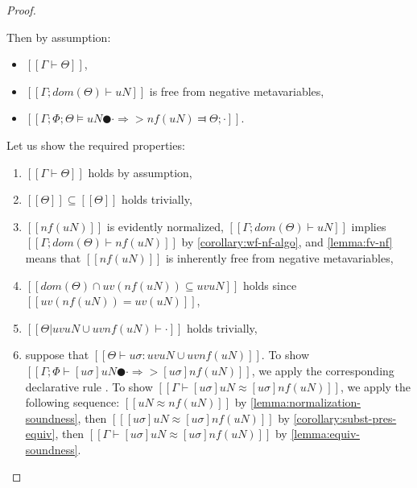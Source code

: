 \begin{proof}
\begin{caseof}
        \item {}
            Then by assumption:
            \begin{itemize}
                \item $[[Γ ⊢ Θ]]$,
                \item $[[Γ; dom(Θ) ⊢  uN]]$ is free from negative metavariables,
                \item $[[Γ; Φ; Θ ⊨ uN ● · ⇒> nf(uN) ⫤ Θ; ·]]$.
            \end{itemize}

            Let us show the required properties: 
            \begin{enumerate}
                \item $[[Γ ⊢ Θ]]$ holds by assumption,
                \item $[[Θ]] \subseteq [[Θ]]$ holds trivially,
                \item $[[nf(uN)]]$ is evidently normalized, 
                    $[[Γ; dom(Θ) ⊢  uN]]$ implies $[[Γ; dom(Θ) ⊢  nf(uN)]]$ by 
                    \cref{corollary:wf-nf-algo},
                    and \cref{lemma:fv-nf} means that $[[nf(uN)]]$ is 
                    inherently free from negative metavariables,
                \item $[[dom(Θ) ∩ uv(nf(uN)) ⊆ uv uN]]$
                    holds since $[[uv(nf(uN)) = uv(uN)]]$,
                \item $[[Θ|uv uN ∪ uv nf(uN) ⊢ ·]]$ holds trivially,
                \item suppose that $[[ Θ ⊢ uσ : uv uN ∪ uv nf(uN) ]]$.
                    To show $[[ Γ ; Φ ⊢ [uσ]uN ● · ⇒> [uσ]nf(uN) ]]$, we apply the corresponding 
                    declarative rule .
                    To show $[[ Γ ⊢ [uσ]uN ≈ [uσ]nf(uN) ]]$,
                    we apply the following sequence:
                    $[[uN ≈ nf(uN)]]$ by 
                    \cref{lemma:normalization-soundness},
                    then $[[ [uσ]uN ≈ [uσ]nf(uN) ]]$
                    by \cref{corollary:subst-pres-equiv},
                    then $[[ Γ ⊢ [uσ]uN ≈ [uσ]nf(uN) ]]$
                    by \cref{lemma:equiv-soundness}. 
            \end{enumerate}


\end{caseof}
\end{proof}

